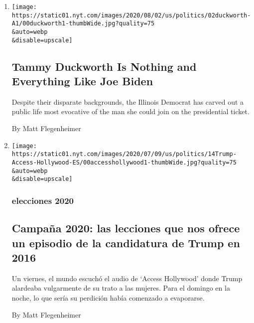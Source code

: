 \begin{enumerate}
\def\labelenumi{\arabic{enumi}.}
\item
  \href{/2020/08/01/us/politics/tammy-duckworth-biden-vp.html}{}

  \texttt{[image: https://static01.nyt.com/images/2020/08/02/us/politics/02duckworth-A1/00duckworth1-thumbWide.jpg?quality=75\\\&auto=webp\\\&disable=upscale]}

  \hypertarget{tammy-duckworth-is-nothing-and-everything-like-joe-biden}{%
  \subsection{Tammy Duckworth Is Nothing and Everything Like Joe
  Biden}\label{tammy-duckworth-is-nothing-and-everything-like-joe-biden}}

  Despite their disparate backgrounds, the Illinois Democrat has carved
  out a public life most evocative of the man she could join on the
  presidential ticket.

  By Matt Flegenheimer
\item
  \href{/es/2020/07/14/espanol/estados-unidos/Donald-trump-eleciones-video-hollywood.html}{}

  \texttt{[image: https://static01.nyt.com/images/2020/07/09/us/politics/14Trump-Access-Hollywood-ES/00accesshollywood1-thumbWide.jpg?quality=75\\\&auto=webp\\\&disable=upscale]}

  \hypertarget{elecciones-2020}{%
  \subsubsection{elecciones 2020}\label{elecciones-2020}}

  \hypertarget{campauxf1a-2020-las-lecciones-que-nos-ofrece-un-episodio-de-la-candidatura-de-trump-en-2016}{%
  \subsection{Campaña 2020: las lecciones que nos ofrece un episodio de
  la candidatura de Trump en
  2016}\label{campauxf1a-2020-las-lecciones-que-nos-ofrece-un-episodio-de-la-candidatura-de-trump-en-2016}}

  Un viernes, el mundo escuchó el audio de `Access Hollywood' donde
  Trump alardeaba vulgarmente de su trato a las mujeres. Para el domingo
  en la noche, lo que sería su perdición había comenzado a evaporarse.

  By Matt Flegenheimer


\end{enumerate}
